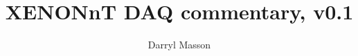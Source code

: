 \documentclass[a4paper,12pt]{report}
\begin{document}
\title{XENONnT DAQ commentary, v0.1}
\author{Darryl Masson}
\maketitle
\tableofcontents
























\end{document}
